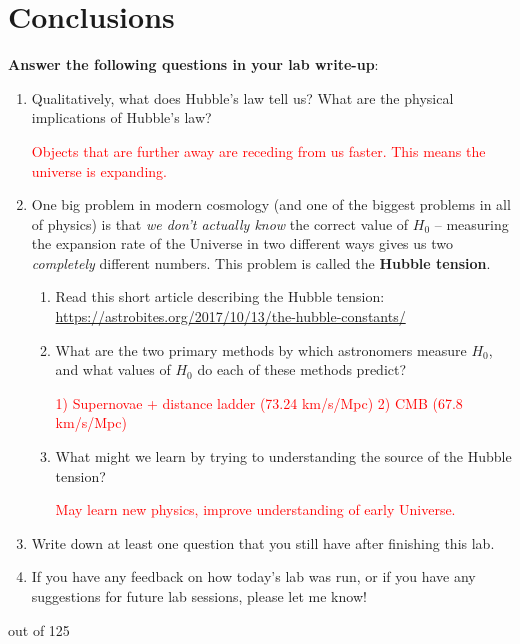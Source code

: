 \documentclass[11pt]{article}
\begin{document}
\section{Conclusions}
\textbf{Answer the following questions in your lab write-up}:
\begin{enumerate}

    \item [4 pts] Qualitatively, what does Hubble's law tell us? What are the physical implications of Hubble's law?
    
    \textcolor{red}{Objects that are further away are receding from us faster.  This means the universe is expanding.}
    
    \item [10 pts] One big problem in modern cosmology (and one of the biggest problems in all of physics) is that \emph{we don't actually know} the correct value of $H_0$ -- measuring the expansion rate of the Universe in two different ways gives us two \emph{completely} different numbers. This problem is called the \textbf{Hubble tension}.
    \begin{enumerate}
        \item Read this short article describing the Hubble tension: \url{https://astrobites.org/2017/10/13/the-hubble-constants/}
        
        \item What are the two primary methods by which astronomers measure $H_0$, and what values of $H_0$ do each of these methods predict?
        
        \textcolor{red}{1) Supernovae + distance ladder (73.24 km/s/Mpc) 2) CMB (67.8 km/s/Mpc)}
        
        \item What might we learn by trying to understanding the source of the Hubble tension?
        
        \textcolor{red}{May learn new physics, improve understanding of early Universe.}
    \end{enumerate}

    \item Write down at least one question that you still have after finishing this lab.
    
    \item If you have any feedback on how today's lab was run, or if you have any suggestions for future lab sessions, please let me know!
    
    
\end{enumerate}
out of 125
\end{document}
